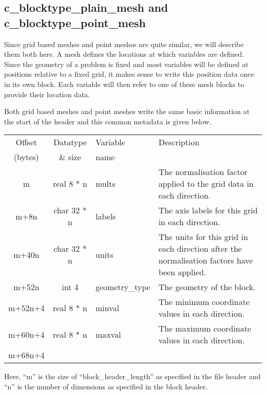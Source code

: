 \documentclass[12pt]{article}
\newcommand{\subsubsec}{\subsection}
\begin{document}
\subsubsec{c\_blocktype\_plain\_mesh and c\_blocktype\_point\_mesh}

Since grid based meshes and point meshes are quite similar, we will describe
them both here. A mesh defines the locations at which variables are defined.
Since the geometry of a problem is fixed and most variables will be defined
at positions relative to a fixed grid, it makes sense to write this position
data once in its own block. Each variable will then refer to one of these
mesh blocks to provide their location data.

Both grid based meshes and point meshes write the same basic information
at the start of the header and this common metadata is given below.\\

\begin{center}
\begin{tabularx}{0.9\textwidth}[!hbt]{cclX}
  Offset & Datatype & Variable & Description\\
  (bytes) & \& size & name &
  \\\toprule

  m & real 8 * n & mults & The normalisation factor applied to the grid data
  in each direction.
  \\\midrule

  m+8n & char 32 * n & labels & The axis labels for this grid in each direction.
  \\\midrule

  m+40n & char 32 * n & units & The units for this grid in each direction
  after the normalisation factors have been applied.
  \\\midrule

  m+52n & int 4 & geometry\_type & The geometry of the block.
  \\\midrule

  m+52n+4 & real 8 * n & minval & The minimum coordinate values in each
  direction.
  \\\midrule

  m+60n+4 & real 8 * n & maxval & The maximum coordinate values in each
  direction.
  \\\midrule

  m+68n+4 &
\end{tabularx}
\end{center}\vspace{10pt}

Here, ``m'' is the size of ``block\_header\_length'' as specified in the file
header and ``n'' is the number of dimensions as specified in the block header.
\end{document}
